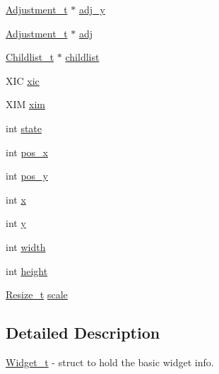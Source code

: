 \begin{DoxyCompactItemize}
\hyperlink{structAdjustment__t}{Adjustment\+\_\+t} $\ast$ \hyperlink{structWidget__t_abde95d3fb49faff5dd852f16810115e7}{adj\+\_\+y}
\item 
\hyperlink{structAdjustment__t}{Adjustment\+\_\+t} $\ast$ \hyperlink{structWidget__t_af3fdf65eb9a663016b91ee87a96d75a8}{adj}
\item 
\hyperlink{structChildlist__t}{Childlist\+\_\+t} $\ast$ \hyperlink{structWidget__t_ac203ccbc58958a7c205897d4aba197e9}{childlist}
\item 
X\+IC \hyperlink{structWidget__t_adafb1b98ea551ef726be6c726ac2e817}{xic}
\item 
X\+IM \hyperlink{structWidget__t_a81aa76d336043a7230844d09a92113e2}{xim}
\item 
int \hyperlink{structWidget__t_aaa935b64805fdeb78acb015c67d6638c}{state}
\item 
int \hyperlink{structWidget__t_ae2d46ffb30bb2335a043d138fa05e1a3}{pos\+\_\+x}
\item 
int \hyperlink{structWidget__t_a9b127ac6b3f017b367351ee673e063c3}{pos\+\_\+y}
\item 
int \hyperlink{structWidget__t_aac6ce7621b682bb4ce88bac9181c34a7}{x}
\item 
int \hyperlink{structWidget__t_acb9402de44e47837e1821b93fc052b38}{y}
\item 
int \hyperlink{structWidget__t_a3204c88196ed5793250b3530dd719037}{width}
\item 
int \hyperlink{structWidget__t_a1def6d2237743e75a0b84ca0c34a6834}{height}
\item 
\hyperlink{structResize__t}{Resize\+\_\+t} \hyperlink{structWidget__t_a9a2d5b53f40f5bf3914fc0694027d7ec}{scale}
\end{DoxyCompactItemize}


\subsection{Detailed Description}
\hyperlink{structWidget__t}{Widget\+\_\+t} -\/ struct to hold the basic widget info. 



